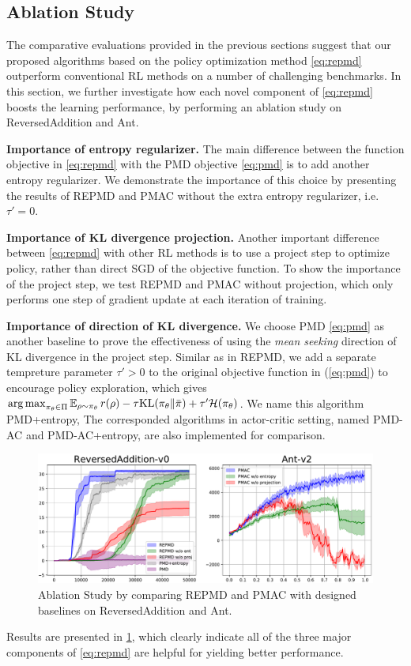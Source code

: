 \subsection{Ablation Study}
\label{subsec:ablationstudy}

The comparative evaluations provided in the previous sections suggest that our proposed algorithms based on the policy optimization method \ref{eq:repmd} outperform conventional RL methods on a number of challenging benchmarks. In this section, we further investigate how each novel component of \cref{eq:repmd} boosts the learning performance, by performing an ablation study on ReversedAddition and Ant.


\textbf{Importance of entropy regularizer.} The main difference between the function objective in \cref{eq:repmd} with the PMD objective \cref{eq:pmd} is to add another entropy regularizer. We demonstrate the importance of this choice by presenting the results of REPMD and PMAC without the extra entropy regularizer, i.e. $\tau'=0$.

\textbf{Importance of KL divergence projection.} Another important difference between \cref{eq:repmd} with other RL methods is to use a project step to optimize policy, rather than direct SGD of the objective function. To show the importance of the project step, we test REPMD and PMAC without projection, which only performs one step of gradient update at each iteration of training. 

\textbf{Importance of direction of KL divergence.} We choose PMD \ref{eq:pmd} as another baseline to prove the effectiveness of using the \emph{mean seeking} direction of KL divergence in the project step. Similar as in REPMD, we add a separate tempreture parameter $\tau' > 0$ to the original objective function in (\ref{eq:pmd}) to encourage policy exploration, which gives $\operatorname*{arg\,max}_{\pi_\theta \in \Pi}{ \operatorname*{\mathbb{E}}_{\rho \sim \pi_\theta}{  r(\rho)  - \tau \text{KL}(\pi_\theta \| \bar{\pi}) } + \tau'\mathcal{H}(\pi_\theta) }$. We name this algorithm PMD+entropy, The corresponded algorithms in actor-critic setting, named PMD-AC and PMD-AC+entropy, are also implemented for comparison.

\begin{figure}[t]
\begin{center}
\includegraphics[width=0.6\linewidth]{./ablation-results.pdf}
\end{center}
\caption{Ablation Study by comparing REPMD and PMAC with designed baselines on ReversedAddition and Ant. }
\label{fig:ablation}
\end{figure}

Results are presented in \cref{fig:ablation}, which clearly indicate all of the three major components of \cref{eq:repmd} are helpful for yielding better performance. 

